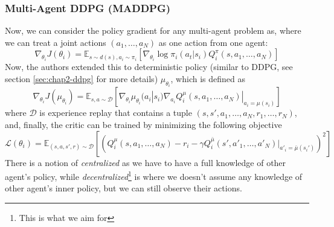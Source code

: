 \subsubsection{Multi-Agent DDPG (MADDPG) \cite{lowe2017multi}}
Now, we can consider the policy gradient for any multi-agent problem as, where we can treat a joint actions $(a_1, \dots, a_N)$ as one action from one agent:
\begin{equation}
\nabla_{\theta_i}J(\theta_i) = \mathbb{E}_{s\sim d(s), a_i \sim \pi_i} \left[ \nabla_{\theta_i} \log \pi_i(a_t | s_i) Q^{\pi}_i(s, a_1, \dots, a_N) \right]
\end{equation}
Now, the authors extended this to deterministic policy (similar to DDPG, see section \ref{sec:chap2-ddpg} for more details) $\mu_{\theta_i}$, which is defined as 
\begin{equation}
    \nabla_{\theta_i}J(\mu_{\theta_i}) = \mathbb{E}_{s, a \sim \mathcal{D}} \left[ \nabla_{\theta_i} \mu_{\theta_i}(a_i | s_i) \nabla_{a_i} Q^{\mu}_i(s, a_1, \dots, a_N) |_{a_i = \mu(s_i)} \right]
\end{equation}
where $\mathcal{D}$ is experience replay that contains a tuple $(s, s', a_1, \dots, a_N, r_1, \dots, r_N)$, and, finally, the critic can be trained by minimizing the following objective 
\begin{equation}
    \mathcal{L}(\theta_i) = \mathbb{E}_{(s, a, s', r) \sim \mathcal{D}}\left[ \left( Q^{\mu}_i (s, a_1, \dots, a_N) - r_i - \gamma Q^{\bar{\mu}}_i(s', a'_1, \dots, a'_N) |_{a'_i = \bar{\mu}(s_i')} \right)^2  \right]
\end{equation}
There is a notion of \textit{centralized} as we have to have a full knowledge of other agent's policy, while \textit{decentralized}\footnote{This is what we aim for} is where we doesn't assume any knowledge of other agent's inner policy, but we can still observe their actions. 

